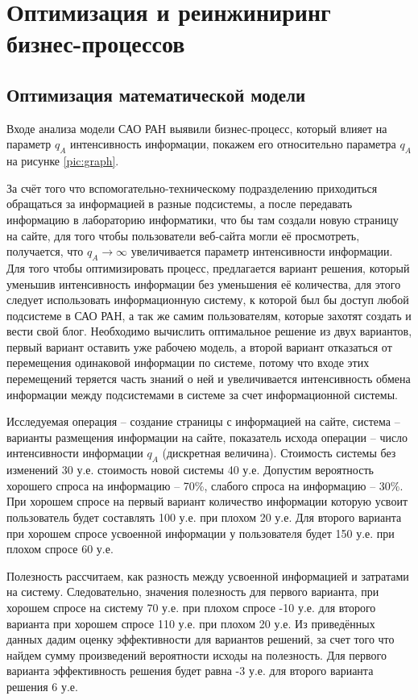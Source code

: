 \section{Оптимизация и реинжиниринг бизнес-процессов}
\subsection{Оптимизация математической модели}
Входе анализа модели САО РАН выявили бизнес-процесс, который влияет на параметр $q_A$ интенсивность информации, покажем его относительно параметра $q_A$ на рисунке \ref{pic:graph}.


За счёт того что вспомогательно-техническому подразделению приходиться обращаться за информацией в разные подсистемы, а после передавать информацию в лабораторию информатики, что бы там создали новую страницу на сайте, для того чтобы пользователи веб-сайта могли её просмотреть, получается, что $q_A \rightarrow \infty$ увеличивается параметр интенсивности информации. Для того чтобы оптимизировать процесс, предлагается вариант решения, который уменьшив интенсивность информации без уменьшения её количества, для этого следует использовать информационную систему, к которой был бы доступ любой подсистеме в САО РАН, а так же самим пользователям, которые захотят создать и вести свой блог.
Необходимо вычислить оптимальное решение из двух вариантов, первый вариант оставить уже рабочею модель, а второй вариант отказаться от перемещения одинаковой информации по системе, потому что входе этих перемещений теряется часть знаний о ней и увеличивается интенсивность обмена информации между подсистемами в системе за счет информационной системы.

Исследуемая операция – создание страницы с информацией на сайте, система – варианты размещения информации на сайте, показатель исхода операции – число интенсивности информации $q_A$ (дискретная величина). Стоимость системы без изменений 30 у.е. стоимость новой системы 40 у.е. Допустим вероятность хорошего спроса на информацию -- 70\%, слабого спроса на информацию -- 30\%. При хорошем спросе на первый вариант количество информации которую усвоит пользователь будет составлять 100 у.е. при плохом 20 у.е. Для второго варианта при хорошем спросе усвоенной информации у пользователя будет 150 у.е. при плохом спросе 60 у.е.

Полезность рассчитаем, как разность между усвоенной информацией и затратами на систему. Следовательно, значения полезность для первого варианта, при хорошем спросе на систему 70 у.е. при плохом спросе -10 у.е. для второго варианта при хорошем спросе 110 у.е. при плохом 20 у.е.
Из приведённых данных дадим оценку эффективности для вариантов решений, за счет того что найдем сумму произведений вероятности исходы на полезность. Для первого варианта эффективность решения будет равна -3 у.е. для второго варианта решения 6 у.е.


